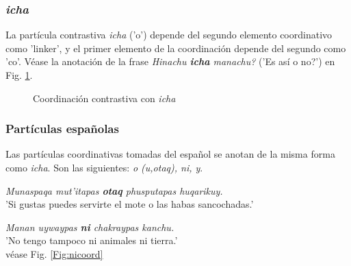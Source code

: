 \documentclass[a4paper,11pt,DIV12]{scrartcl}
\begin{document}
\subsubsection{{\em icha}}\label{Sec:icha}
La part\'icula contrastiva {\em icha} ('o') depende del segundo elemento coordinativo como 'linker', y el primer elemento de la coordinaci\'on depende del segundo como 'co'. V\'ease la anotaci\'on de la frase  {\em Hinachu \textbf{icha} manachu?} ('{\textquestiondown}Es as\'i o no?') en Fig. \ref{Fig:ichacoord}.

\begin{figure}
\begin{center}
\caption{Coordinaci\'on contrastiva con {\em icha}}\label{Fig:ichacoord}
\end{center}
\end{figure}


\subsubsection{Part\'iculas espa\~nolas}
Las part\'iculas coordinativas tomadas del espa\~nol se anotan de la misma forma como {\em icha}. Son las siguientes: {\em o (u,otaq), ni, y}.

\begin{examples}
 \item {\em Munaspaqa mut'itapas \textbf{otaq} phusputapas huqarikuy.}\\
	'Si gustas puedes servirte el mote o las habas sancochadas.'
 \item {\em Manan uywaypas \textbf{ni} chakraypas kanchu.}\\
      'No tengo tampoco ni animales ni tierra.'\\
	v\'ease Fig. \ref{Fig:nicoord}\\
	\hfill{\small \citep[142-143]{Cusi2}}
\end{examples}
\end{document}
